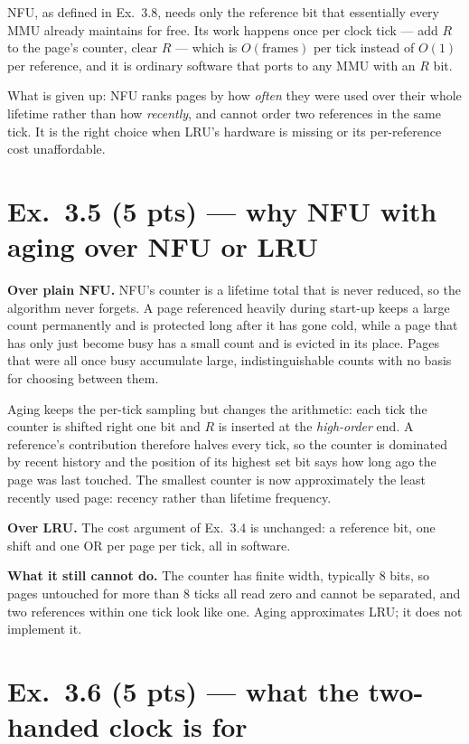 NFU, as defined in Ex.\ 3.8, needs only the reference bit that essentially every MMU
already maintains for free. Its work happens once per clock tick --- add $R$ to the
page's counter, clear $R$ --- which is $O(\text{frames})$ per tick instead of $O(1)$
per reference, and it is ordinary software that ports to any MMU with an $R$ bit.

What is given up: NFU ranks pages by how \emph{often} they were used over their whole
lifetime rather than how \emph{recently}, and cannot order two references in the same
tick. It is the right choice when LRU's hardware is missing or its per-reference cost
unaffordable.

\section*{Ex.\ 3.5 \quad (5 pts) --- why NFU with aging over NFU or LRU}

\textbf{Over plain NFU.} NFU's counter is a lifetime total that is never reduced, so
the algorithm never forgets. A page referenced heavily during start-up keeps a large
count permanently and is protected long after it has gone cold, while a page that has
only just become busy has a small count and is evicted in its place. Pages that were
all once busy accumulate large, indistinguishable counts with no basis for choosing
between them.

Aging keeps the per-tick sampling but changes the arithmetic: each tick the counter is
shifted right one bit and $R$ is inserted at the \emph{high-order} end. A reference's
contribution therefore halves every tick, so the counter is dominated by recent
history and the position of its highest set bit says how long ago the page was last
touched. The smallest counter is now approximately the least recently used page:
recency rather than lifetime frequency.

\textbf{Over LRU.} The cost argument of Ex.\ 3.4 is unchanged: a reference bit, one
shift and one OR per page per tick, all in software.

\textbf{What it still cannot do.} The counter has finite width, typically 8 bits, so
pages untouched for more than 8 ticks all read zero and cannot be separated, and two
references within one tick look like one. Aging approximates LRU; it does not
implement it.

\section*{Ex.\ 3.6 \quad (5 pts) --- what the two-handed clock is for}

